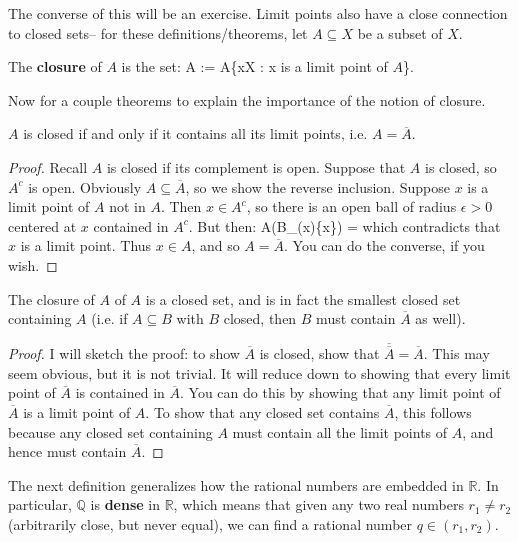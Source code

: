 	The converse of this will be an exercise. Limit points also have a close connection to closed sets-- for these definitions/theorems, let $A\subseteq X$ be 
	a subset of $X$.
	
	\begin{definition}[Closure]
		The \textbf{closure} of $A$ is the set:
		\eq
			\overline A := A\cup\{x\in X : x\textnormal{ is a limit point of $A$}\}.
		\qe
	\end{definition}
	
	Now for a couple theorems to explain the importance of the notion of closure.
	
	\begin{theorem}
		$A$ is closed if and only if it contains all its limit points, i.e. $A= \overline{A}$.
	\end{theorem}
	
	\begin{proof}
		Recall $A$ is closed if its complement is open. Suppose that $A$ is closed, so $A^c$ is open. Obviously $A\subseteq\overline A$, so we show the 
		reverse inclusion. Suppose $x$ is a limit point of $A$ not in $A$. Then $x	\in A^c$, so there is an open ball of radius $\epsilon > 0$ centered at $x$ 
		contained in $A^c$. But then:
		\eq
			A\cap(B_\epsilon(x)\setminus\{x\}) = \emptyset
		\qe
		which contradicts that $x$ is a limit point. Thus $x\in A$, and so $A = \overline A$. You can do the converse, if you wish.
	\end{proof}
	
	\begin{theorem}
		The closure of $A$ of $A$ is a closed set, and is in fact the smallest closed set containing $A$ (i.e. if $A\subseteq B$ with $B$ closed, then $B$ must 
		contain $\overline A$ as well).
	\end{theorem}
	
	\begin{proof}
		I will sketch the proof: to show $\overline A$ is closed, show that $\overline{\overline A} = \overline A$. This may seem obvious, but it is not trivial. It 
		will reduce down to showing that every limit point of $\overline A$ is contained in $\overline A$. You can do this by showing that any limit point of 
		$\overline A$ is a limit point of $A$. To show that any closed set contains $\overline A$, this follows because any closed set containing $A$ must 
		contain all the limit points of $A$, and hence must contain $\overline A$. 
	\end{proof}
	
	The next definition generalizes how the rational numbers are embedded in $\mathbb R$. In particular, $\mathbb Q$ is \textbf{dense} in $\mathbb R$, which 
	means that given any two real numbers $r_1\neq r_2$ (arbitrarily close, but never equal), we can find a rational number $q\in (r_1, r_2)$. 
	

